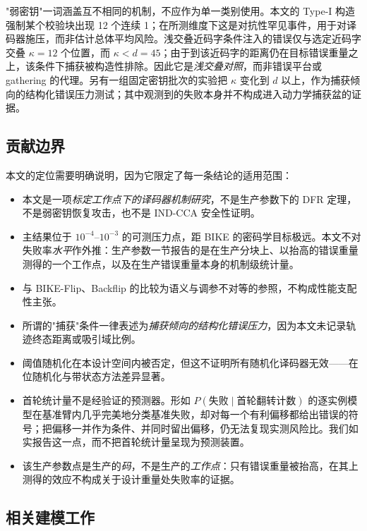 \documentclass[UTF8,a4paper,10pt,twocolumn]{ctexart}
\begin{document}
"弱密钥"一词涵盖互不相同的机制，不应作为单一类别使用。本文的 Type-I 构造强制某个校验块出现 12 个连续 1；在所测维度下这是对抗性罕见事件，用于对译码器施压，而非估计总体平均风险。浅交叠近码字条件注入的错误仅与选定近码字交叠 $\kappa=12$ 个位置，而 $\kappa<d=45$；由于到该近码字的距离仍在目标错误重量之上，该条件下捕获被构造性排除。因此它是\emph{浅交叠对照}，而非错误平台或 gathering 的代理。另有一组固定密钥批次的实验把 $\kappa$ 变化到 $d$ 以上，作为捕获倾向的结构化错误压力测试；其中观测到的失败本身并不构成进入动力学捕获盆的证据。

\subsection{贡献边界}

本文的定位需要明确说明，因为它限定了每一条结论的适用范围：

\begin{itemize}[leftmargin=1.4em,itemsep=0.15em,topsep=0.25em]
\item 本文是一项\emph{标定工作点下的译码器机制研究}，不是生产参数下的 DFR 定理，不是弱密钥恢复攻击，也不是 IND-CCA 安全性证明。
\item 主结果位于 $10^{-4}$--$10^{-3}$ 的可测压力点，距 BIKE 的密码学目标极远。本文不对失败率\emph{水平}作外推：生产参数一节报告的是在生产分块上、以抬高的错误重量测得的一个工作点，以及在生产错误重量本身的机制级统计量。
\item 与 BIKE-Flip、Backflip 的比较为语义与调参不对等的参照，不构成性能支配性主张。
\item 所谓的"捕获"条件一律表述为\emph{捕获倾向的结构化错误压力}，因为本文未记录轨迹终态距离或吸引域比例。
\item 阈值随机化在本设计空间内被否定，但这不证明所有随机化译码器无效——在位随机化与带状态方法差异显著\cite{baldi2021inplace}。
\item 首轮统计量不是经验证的预测器。形如 $P(\text{失败}\mid\text{首轮翻转计数})$ 的逐实例模型在基准臂内几乎完美地分类基准失败，却对每一个有利偏移都给出错误的符号；把偏移一并作为条件、并同时留出偏移，仍无法复现实测风险比。我们如实报告这一点，而不把首轮统计量呈现为预测装置。
\item 该生产参数点是生产的\emph{码}，不是生产的\emph{工作点}：只有错误重量被抬高，在其上测得的效应不构成关于设计重量处失败率的证据。
\end{itemize}

\subsection{相关建模工作}
\end{document}
